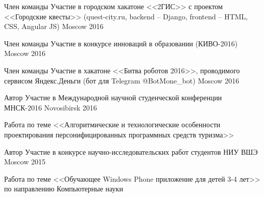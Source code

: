 


\begin{cventries}


\cventry
{Член команды} %
{Участие в городском хакатоне <<2ГИС>> с проектом <<Городские квесты>> (quest-city.ru, backend – Django, frontend – HTML, CSS, Angular JS)} %
{Moscow} %
{2016} %
{ %
}


\cventry
{Член команды} %
{Участие в конкурсе инноваций в образовании (КИВО-2016)} %
{Moscow} %
{2016} %
{ %
}


\cventry
{Член команды} %
{Участие в хакатоне <<Битва роботов 2016>>, проводимого сервисом Яндекс.Деньги (бот для Telegram @BotMone\_bot)} %
{Moscow} %
{2016} %
{ %
}


\cventry
{Автор} %
{Участие в Международной научной студенческой конференции МНСК-2016} %
{Novosibirsk} %
{2016} %
{ %
\begin{cvitems}
\item {Работа по теме <<Алгоритмические и технологические особенности проектирования персонифицированных программных средств туризма>>}
\end{cvitems}
}


\cventry
{Автор} %
{Участие в конкурсе научно-исследовательских работ студентов НИУ ВШЭ} %
{Moscow} %
{2015} %
{ %
\begin{cvitems}
\item {Работа по теме <<Обучающее Windows Phone приложение для детей 3-4 лет>> по направлению Компьютерные науки}
\end{cvitems}
}


\end{cventries}
